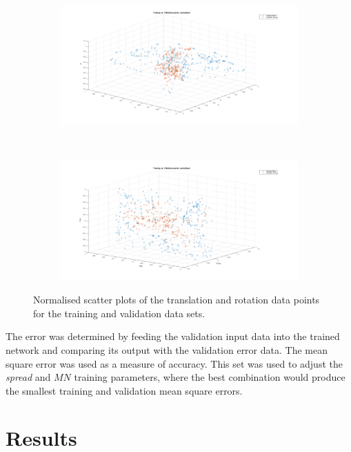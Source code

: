 \begin{figure}
  \centering
  \begin{subfigure}{\textwidth}
    \includegraphics[clip, trim = 100 50 100 0, width=\textwidth]{figures/chapter4/3d_pose_tr_v}
    \caption{}
  \end{subfigure}
~
  \begin{subfigure}{\textwidth}
    \includegraphics[clip, trim = 100 50 100 0, width=\textwidth]{figures/chapter4/3d_rot_tr_v}
    \caption{}
  \end{subfigure}
  \caption[Scatter plots of the training and validation data. ]{Normalised scatter plots of the translation and rotation data points for the training and validation data sets. }
  \label{fig:chap4-scatter-tr-v}
\end{figure}

The error was determined by feeding the validation input data into the trained network and comparing its output with the validation error data. The mean square error was used as a measure of accuracy. This set was used to adjust the \emph{spread} and $\mathit{MN}$ training parameters, where the best combination would produce the smallest training and validation mean square errors. 

\section{Results}

